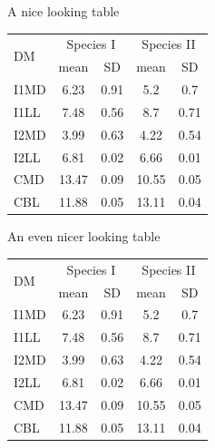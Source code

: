 \documentclass[10pt,times]{beamer}
\begin{document}
\begin{frame}[fragile]{A nice looking table}
\begin{exampletwouptinyfifty}
\begin{tabular}{l c c c c}
\hline 
\multirow{2}{*}{DM}
 & \multicolumn{2}{c}{Species I}
 & \multicolumn{2}{c}{Species II} \\ 
\cline{2-5}
  & mean & SD  & mean & SD  \\ 
\hline
I1MD & 6.23 & 0.91 & 5.2  & 0.7  \\

I1LL & 7.48 & 0.56 & 8.7  & 0.71 \\

I2MD & 3.99 & 0.63 & 4.22 & 0.54 \\

I2LL & 6.81 & 0.02 & 6.66 & 0.01 \\

CMD & 13.47 & 0.09 & 10.55 & 0.05 \\

CBL & 11.88 & 0.05 & 13.11 & 0.04\\ 
\hline 
\end{tabular}
\end{exampletwouptinyfifty}
\end{frame}

\begin{frame}[fragile]{An even nicer looking table}
\begin{exampletwouptinyfifty}
\begin{tabular}{l c c c c}
\toprule
\multirow{2}{*}{DM} 
	& \multicolumn{2}{c}{Species I} 
	& \multicolumn{2}{c}{Species II} \\ 
\cmidrule{2-5}
  & mean & SD  & mean & SD  \\ 
\midrule
I1MD & 6.23 & 0.91 & 5.2  & 0.7  \\

I1LL & 7.48 & 0.56 & 8.7  & 0.71 \\

I2MD & 3.99 & 0.63 & 4.22 & 0.54 \\

I2LL & 6.81 & 0.02 & 6.66 & 0.01 \\

CMD & 13.47 & 0.09 & 10.55 & 0.05 \\

CBL & 11.88 & 0.05 & 13.11 & 0.04\\ 
\bottomrule
\end{tabular}
\end{exampletwouptinyfifty}
\end{frame}
\end{document}
